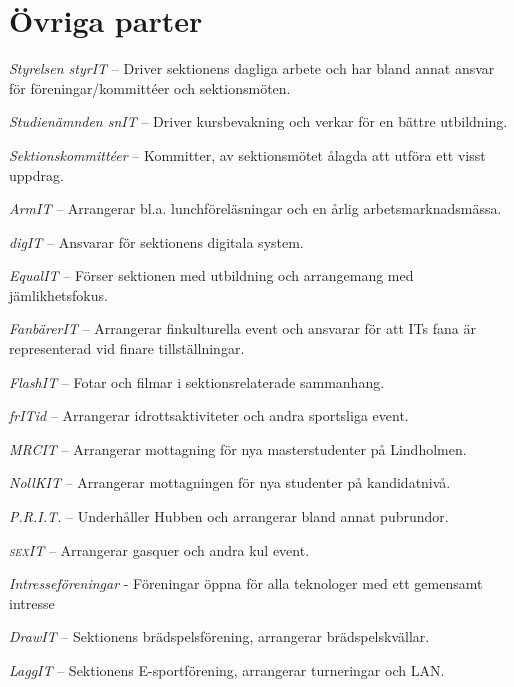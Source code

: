 \documentclass[11pt, noincludeaddress]{classes/cthit}
\let\tempone\itemize
\let\temptwo\enditemize
\renewenvironment{itemize}{\tempone\addtolength{\itemsep}{-0.3\baselineskip}}{\temptwo}
\begin{document}
\section{Övriga parter}
\begin{itemize}
    \item \textit{Styrelsen styrIT} -- Driver sektionens dagliga arbete och har bland annat ansvar för föreningar/kommittéer och sektionsmöten.
    \item \textit{Studienämnden snIT} -- Driver kursbevakning och verkar för en bättre utbildning.
    \item \textit{Sektionskommittéer} -- Kommitter, av sektionsmötet ålagda att utföra ett visst uppdrag.
    \begin{itemize}
        \item \textit{ArmIT} -- Arrangerar bl.a. lunchföreläsningar och en årlig arbetsmarknadsmässa.
        \item \textit{digIT} -- Ansvarar för sektionens digitala system.
        \item \textit{EqualIT} -- Förser sektionen med utbildning och arrangemang med jämlikhetsfokus.
        \item \textit{FanbärerIT} -- Arrangerar finkulturella event och ansvarar för att ITs fana är representerad vid finare tillställningar.
        \item \textit{FlashIT} -- Fotar och filmar i sektionsrelaterade sammanhang.
        \item \textit{frITid} -- Arrangerar idrottsaktiviteter och andra sportsliga event.
        \item \textit{MRCIT} -- Arrangerar mottagning för nya masterstudenter på Lindholmen.
        \item \textit{NollKIT} -- Arrangerar mottagningen för nya studenter på kandidatnivå.
        \item \textit{P.R.I.T.} -- Underhåller Hubben och arrangerar bland annat pubrundor.
        \item \textit{\textsc{sex}IT} -- Arrangerar gasquer och andra kul event.
    \end{itemize}
    \item \textit{Intresseföreningar} - Föreningar öppna för alla teknologer med ett gemensamt intresse
    \begin{itemize}
        \item \textit{DrawIT} -- Sektionens brädspelsförening, arrangerar brädspelskvällar.
        \item \textit{LaggIT} -- Sektionens E-sportförening, arrangerar turneringar och LAN.

\end{itemize}
\end{itemize}
\end{document}
